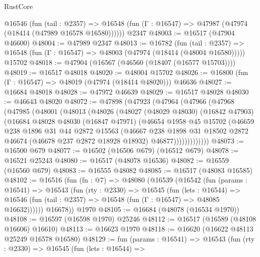 \begin{lexlean}{RustCore}
\begin{coremodule}
    @16546
      (fun (tail : @2357) =>
      @16548 (fun (Γ : @16547) => @47987 (@47974 (@18414 (@47989 @16578 @16580))))))
    @2347
@48003 := @16517 (@47904 @46600)
@48004 := @47989 @2347
@48013 := @16782
    (fun (tail : @2357) => @16548 (fun (Γ : @16547) => @48003 (@47974 (@18414 (@48004 @16580)))))
    @15702
@48018 := @47904 (@16567 (@46560 (@18407 (@16577 @15703))))
@48019 := @16517 @48018
@48020 := @48004 @15702
@48026 := @16800 (fun (Γ : @16547) => @48019 (@47974 (@18414 @48020))) @46636
@48027 := @16684 @48018
@48028 := @47972 @46639
@48029 := @16517 @48028
@48030 := @46643 @48020
@48072 := @47898
    (@47923
      (@47964
        (@47966
          (@47968
            (@47985
              (@48001
                (@48013
                  (@48026
                    (@48027
                      (@48029 @48030)
                      (@16842 @47903)
                      (@16684
                        @48028
                        @48030
                        (@16847 @47971)
                        (@46654
                          @1958
                          @45
                          @15702
                          (@46659
                            @238
                            @1896
                            @31
                            @44
                            @2872
                            @15563
                            (@46667
                              @238
                              @1898
                              @31
                              @18502
                              @2872
                              @46674
                              (@46678 @237 @2872 @18928 @18932)
                              @46877)))))))))))))
@48073 := @16500 @679
@48077 := @16502 (@16506 @679) (@16512 @679)
@48078 := @16521 @25243
@48080 := @16517 (@48078 @16536)
@48082 := @16559 (@16560 @679)
@48083 := @16555 @48082
@48085 := @16517 (@48083 @16585)
@48102 := @16516
    (fun (fn : @7) =>
    @48080
      (@16539
        (@16542
          (fun (params : @16541) =>
          @16543
            (fun (rty : @2330) =>
            @16545
              (fun (lets : @16544) =>
              @16546 (fun (tail : @2357) => @16548 (fun (Γ : @16547) => @48085 @16632))))))
        @16678))
    @1970
@48105 := @16684 (@48078 (@16534 @1970))
@48108 := @16597 (@16598 @1970) @25246
@48112 := @16517 (@16589 (@48108 @16606) @16610)
@48113 := @16623 @1970
@48118 := @16620 (@16622 @48113 @25249 @16578 @16580)
@48129 := fun (params : @16541) =>
  @16543
    (fun (rty : @2330) =>
    @16545
      (fun (lets : @16544) =>

\end{coremodule}
\end{lexlean}
